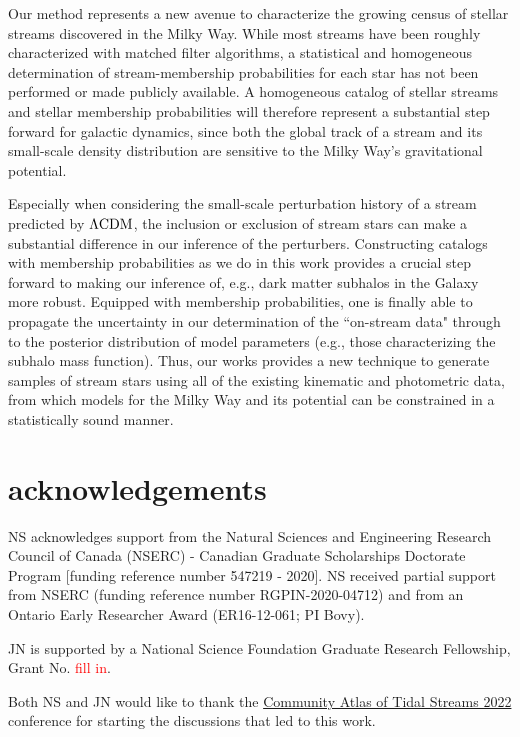 \documentclass[twocolumn]{aastex631}
\newcommand{\TODO}[1]{{\textcolor{red}{#1}}}
\newcommand{\JN}[1]{\TODO{#1}}
\begin{document}
    
    Our method represents a new avenue to characterize the growing census of
    stellar streams discovered in the Milky Way. While most streams have been
    roughly characterized with matched filter algorithms, a statistical and
    homogeneous determination of stream-membership probabilities for each star
    has not been performed or made publicly available. A homogeneous catalog of
    stellar streams and stellar membership probabilities will therefore
    represent a substantial step forward for galactic dynamics, since both the
    global track of a stream and its small-scale density distribution are
    sensitive to the Milky Way's gravitational potential. 
    
    Especially when considering the small-scale perturbation history of a stream
    predicted by $\Lambda\rm{CDM}$, the inclusion or exclusion of stream stars
    can make a substantial difference in our inference of the perturbers.
    Constructing catalogs with membership probabilities as we do in this work
    provides a crucial step forward to making our inference of, e.g., dark
    matter subhalos in the Galaxy more robust. Equipped with membership
    probabilities, one is finally able to propagate the uncertainty in our
    determination of the ``on-stream data" through to the posterior distribution
    of model parameters (e.g., those characterizing the subhalo mass function).
    Thus, our works provides a new technique to generate samples of stream stars
    using all of the existing kinematic and photometric data, from which models
    for the Milky Way and its potential can be constrained in a statistically
    sound manner.



\section{acknowledgements}

    NS acknowledges support from the Natural Sciences and Engineering Research
    Council of Canada (NSERC) - Canadian Graduate Scholarships Doctorate Program
    [funding reference number 547219 - 2020].  NS received partial support from
    NSERC (funding reference number RGPIN-2020-04712) and from an Ontario Early
    Researcher Award (ER16-12-061; PI Bovy).

    JN is supported by a National Science Foundation Graduate Research
    Fellowship, Grant No. \JN{fill in}.

    Both NS and JN would like to thank the
    \href{https://stellarstreams.org/streams22/}{Community Atlas of Tidal
    Streams 2022} conference for starting the discussions that led to this work. 
\end{document}
